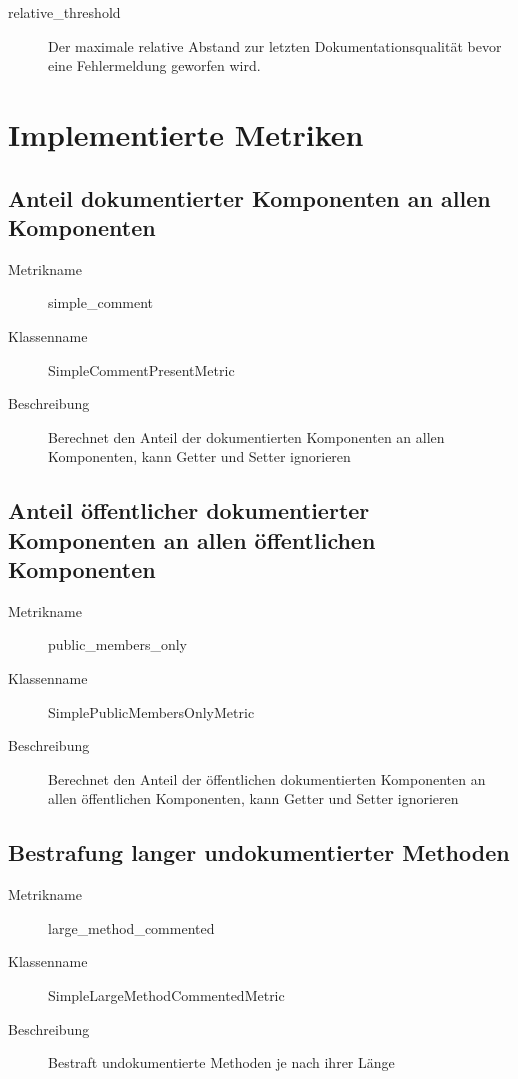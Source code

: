 \begin{appendices}
\begin{description}
         \item[relative\_threshold] Der maximale  relative Abstand zur letzten Dokumentationsqualität bevor eine Fehlermeldung geworfen wird.
        
        
        
    \label{enum:tool_javadoc_conf}
\end{description}
\chapter{Implementierte Metriken}\label{appendix_metrics}
\section{Anteil dokumentierter Komponenten an allen Komponenten}
\begin{description}
    \item [Metrikname]  simple\_comment
    \item [Klassenname] SimpleCommentPresentMetric
    \item[Beschreibung] Berechnet den Anteil der dokumentierten Komponenten an allen Komponenten, kann Getter und Setter ignorieren
\end{description}

\section{Anteil öffentlicher dokumentierter Komponenten an allen öffentlichen Komponenten}
\begin{description}
    \item [Metrikname]  public\_members\_only
    \item [Klassenname] SimplePublicMembersOnlyMetric
    \item[Beschreibung] Berechnet den Anteil der öffentlichen dokumentierten Komponenten an allen öffentlichen Komponenten, kann Getter und Setter ignorieren
\end{description}

\section{Bestrafung langer undokumentierter Methoden}
\begin{description}
    \item [Metrikname]  large\_method\_commented
    \item [Klassenname] SimpleLargeMethodCommentedMetric
    \item[Beschreibung] Bestraft undokumentierte Methoden je nach ihrer Länge
\end{description}


\end{appendices}
